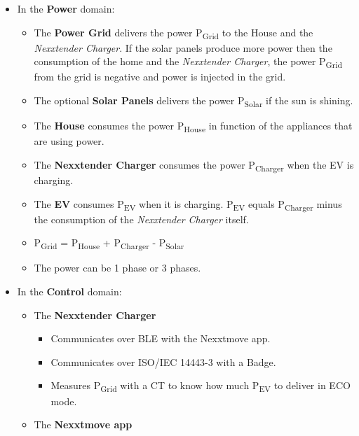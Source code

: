 \documentclass[a4paper]{article}
\begin{document}
\begin{itemize}
	
	\item
	      In the \textbf{Power} domain:
	      
	      \begin{itemize}
	      	  
	      	\item
	      	      The \textbf{Power Grid} delivers the power P\textsubscript{Grid} to
	      	      the House and the \emph{Nexxtender Charger}. 
	      	      If the solar panels produce more power then the consumption of the home and the
	      	      \emph{Nexxtender Charger}, 
	      	      the power P\textsubscript{Grid} from the grid is negative and power is injected in the grid.
	      	\item
	      	      The optional \textbf{Solar Panels} delivers the power  P\textsubscript{Solar} if the sun is shining.
	      	\item
	      	      The \textbf{House} consumes the power P\textsubscript{House} in
	      	      function of the appliances that are using power.
	      	\item
	      	      The \textbf{Nexxtender Charger} consumes the power
	      	      P\textsubscript{Charger} when the EV is charging.
	      	\item
	      	      The \textbf{EV} consumes P\textsubscript{EV} when it is charging.
	      	      P\textsubscript{EV} equals P\textsubscript{Charger} minus the
	      	      consumption of the \emph{Nexxtender Charger} itself.
	      	\item
	      	      P\textsubscript{Grid} = P\textsubscript{House} +
	      	      P\textsubscript{Charger} - P\textsubscript{Solar}
	      	\item
	      	      The power can be 1 phase or 3 phases.
	      \end{itemize}
	\item
	      In the \textbf{Control} domain:
	      
	      \begin{itemize}
	      	  
	      	\item
	      	      The \textbf{Nexxtender Charger}
	      	      
	      	      \begin{itemize}
	      	      	    
	      	      	\item
	      	      	      Communicates over BLE with the Nexxtmove app.
	      	      	\item
	      	      	      Communicates over ISO/IEC 14443-3 with a Badge.
	      	      	\item
	      	      	      Measures P\textsubscript{Grid} with a CT to know how much
	      	      	      P\textsubscript{EV} to deliver in ECO mode.
	      	      \end{itemize}
	      	\item
	      	      The \textbf{Nexxtmove app}
	      	      

\end{itemize}
\end{itemize}
\end{document}
